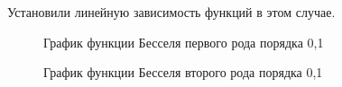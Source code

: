 \documentclass[12pt, a4paper]{report}
\begin{document}
Установили линейную зависимость функций в этом случае.

\begin{figure}[H]
	\caption{График функции Бесселя первого рода порядка 0,1}
\end{figure}

\begin{figure}[H]
	\caption{График функции Бесселя второго рода порядка 0,1}
\end{figure}
\end{document}
